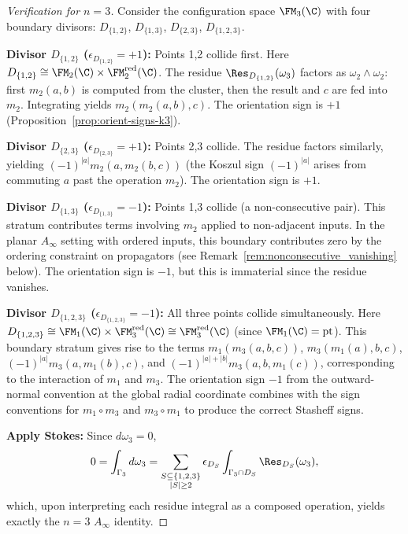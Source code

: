 \begin{proof}[Verification for $n=3$]
Consider the configuration space $\FM_3(\C)$ with four boundary divisors: $D_{\{1,2\}}$, $D_{\{1,3\}}$, $D_{\{2,3\}}$, $D_{\{1,2,3\}}$.

\textbf{Divisor $D_{\{1,2\}}$ ($\epsilon_{D_{\{1,2\}}} = +1$):} Points 1,2 collide first. Here $D_{\{1,2\}} \cong \FM_2(\C) \times \FM_2^{\mathrm{red}}(\C)$. The residue $\Res_{D_{\{1,2\}}}(\omega_3)$ factors as $\omega_2 \wedge \omega_2$: first $m_2(a,b)$ is computed from the cluster, then the result and $c$ are fed into $m_2$. Integrating yields $m_2(m_2(a,b),c)$. The orientation sign is $+1$ (Proposition~\ref{prop:orient-signs-k3}).

\textbf{Divisor $D_{\{2,3\}}$ ($\epsilon_{D_{\{2,3\}}} = +1$):} Points 2,3 collide. The residue factors similarly, yielding $(-1)^{|a|} m_2(a, m_2(b,c))$ (the Koszul sign $(-1)^{|a|}$ arises from commuting $a$ past the operation $m_2$). The orientation sign is $+1$.

\textbf{Divisor $D_{\{1,3\}}$ ($\epsilon_{D_{\{1,3\}}} = -1$):} Points 1,3 collide (a non-consecutive pair). This stratum contributes terms involving $m_2$ applied to non-adjacent inputs. In the planar $A_\infty$ setting with ordered inputs, this boundary contributes zero by the ordering constraint on propagators (see Remark~\ref{rem:nonconsecutive_vanishing} below). The orientation sign is $-1$, but this is immaterial since the residue vanishes.

\textbf{Divisor $D_{\{1,2,3\}}$ ($\epsilon_{D_{\{1,2,3\}}} = -1$):} All three points collide simultaneously. Here $D_{\{1,2,3\}} \cong \FM_1(\C) \times \FM_3^{\mathrm{red}}(\C) \cong \FM_3^{\mathrm{red}}(\C)$ (since $\FM_1(\C) = \mathrm{pt}$). This boundary stratum gives rise to the terms $m_1(m_3(a,b,c))$, $m_3(m_1(a),b,c)$, $(-1)^{|a|}m_3(a,m_1(b),c)$, and $(-1)^{|a|+|b|}m_3(a,b,m_1(c))$, corresponding to the interaction of $m_1$ and $m_3$. The orientation sign $-1$ from the outward-normal convention at the global radial coordinate combines with the sign conventions for $m_1 \circ m_3$ and $m_3 \circ m_1$ to produce the correct Stasheff signs.

\textbf{Apply Stokes:} Since $d\omega_3 = 0$,
\[
0 = \int_{\Gamma_3} d\omega_3 = \sum_{\substack{S \subseteq \{1,2,3\} \\ |S| \geq 2}} \epsilon_{D_S} \int_{\Gamma_3 \cap D_S} \Res_{D_S}(\omega_3),
\]
which, upon interpreting each residue integral as a composed operation, yields exactly the $n=3$ $A_\infty$ identity.
\end{proof}

